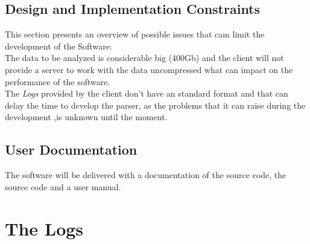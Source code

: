 \documentclass{scrreprt}
\begin{document}
\section{Design and Implementation Constraints}
This section presents an overview of possible issues that cam limit the
development of the Software:\\
The data to be analyzed is considerable big (400Gb) and the client will not provide a
server to work with the data uncompressed what can impact on the performance of
the software.\\
The \textit{Logs} provided by the client don't have an standard format and that
can delay the time to develop the parser, as the problems that it can raise
during the development ,is unknown until the moment.




\section{User Documentation}
The software will be delivered with a documentation of the source code, the
source code and a user manual.



\chapter{The Logs}
\end{document}
